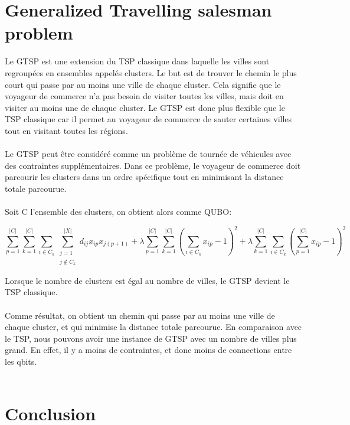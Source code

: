 \documentclass{article}
\begin{document}
        \section{Generalized Travelling salesman problem}

        Le GTSP est une extension du TSP classique dans laquelle les villes sont regroupées en ensembles appelés clusters. Le but est de trouver le chemin le plus court qui passe par au moins une ville de chaque cluster. Cela signifie que le voyageur de commerce n'a pas besoin de visiter toutes les villes, mais doit en visiter au moins une de chaque cluster. Le GTSP est donc plus flexible que le TSP classique car il permet au voyageur de commerce de sauter certaines villes tout en visitant toutes les régions.\\\\
        Le GTSP peut être considéré comme un problème de tournée de véhicules avec des contraintes supplémentaires. Dans ce problème, le voyageur de commerce doit parcourir les clusters dans un ordre spécifique tout en minimisant la distance totale parcourue.\\\\
        Soit C l'ensemble des clusters, on obtient alors comme QUBO:

        \begin{equation*}
            \sum_{p=1}^{|C|} \sum_{k=1}^{|C|}\sum_{i \in C_k}\sum_{\substack{j=1 \\ j \notin C_k}}^{|X|}d_{ij}x_{ip}x_{j(p+1)} + \lambda\sum_{p=1}^{|C|}\sum_{k=1}^{|C|}(\sum_{i \in C_k}x_{ip}-1)^2 + \lambda\sum_{k=1}^{|C|}\sum_{i \in C_k}(\sum_{p=1}^{|C|}x_{ip} - 1)^2
        \end{equation*}


        Lorsque le nombre de clusters est égal au nombre de villes, le GTSP devient le TSP classique.\\\\
        Comme résultat, on obtient un chemin qui passe par au moins une ville de chaque cluster, et qui minimise la distance totale parcourue.
        En comparaison avec le TSP, nous pouvons avoir une instance de GTSP avec un nombre de villes plus grand.
        En effet, il y a moins de contraintes, et donc moins de connections entre les qbits.\\\\


        \section{Conclusion}
\end{document}

